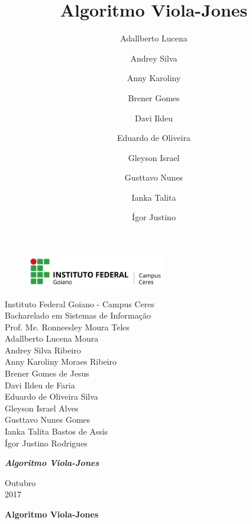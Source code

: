 \documentclass[12pt,a4paper]{article}
\title{Algoritmo Viola-Jones}
\author{Adallberto Lucena \and Andrey Silva \and Anny Karoliny \and Brener Gomes \and Davi Ildeu \and Eduardo de Oliveira \and Gleyson Israel \and Gusttavo Nunes \and Ianka Talita \and Ígor Justino}
\begin{document}
\begin{titlepage}


\begin{center}
\begin{figure}[htb]
		
		\label{figura:LogoIF}
	
		\centering
		\includegraphics[width=6cm]{recursos/imagens/logo.png} 
\end{figure}


Instituto Federal Goiano - Campus Ceres\\
Bacharelado em Sistemas de Informação\\
Prof. Me. Ronneesley Moura Teles\\\vspace{0.5cm}
Adallberto Lucena Moura \\
Andrey Silva Ribeiro\\
Anny Karoliny Moraes Ribeiro \\
Brener Gomes de Jesus\\
Davi Ildeu de Faria\\
Eduardo de Oliveira Silva\\
Gleyson Israel Alves\\
Gusttavo Nunes Gomes\\
Ianka Talita Bastos de Assis\\
Ígor Justino Rodrigues\\



\vspace{5.0cm}

\textit{\textbf{\Large{Algoritmo Viola-Jones}}}\\\vspace{0.5cm}
\vspace{9.5cm}

Outubro\\
2017\\
\end{center}
\end{titlepage}



\tableofcontents

\newpage
\begin{center}
\textbf{\Large{Algoritmo Viola-Jones}}\\\vspace{0.5cm}
\end{center}
\end{document}
